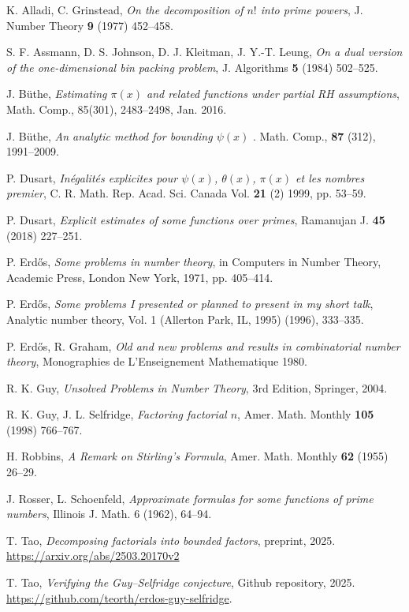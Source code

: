 \documentclass[12pt,a4paper,reqno]{amsart}
\numberwithin{equation}{section}
\theoremstyle{plain}
\theoremstyle{definition}
\begin{document}
\begin{thebibliography}{10}

  
K. Alladi, C. Grinstead, \emph{On the decomposition of $n!$ into prime powers}, J. Number Theory \textbf{9} (1977) 452--458.

S. F. Assmann, D. S. Johnson, D. J. Kleitman, J. Y.-T. Leung, \emph{On a dual version of the one-dimensional bin packing problem}, J. Algorithms \textbf{5} (1984) 502--525.

J. B\"uthe, \emph{Estimating $\pi(x)$ and related functions under partial RH assumptions}, Math. Comp., 85(301), 2483--2498, Jan. 2016.

J. B\"uthe, \emph{An analytic method for bounding $\psi(x)$
}. Math. Comp., \textbf{87} (312), 1991--2009.


P. Dusart, \emph{In\'egalit\'es explicites pour $\psi(x)$, $\theta(x)$, $\pi(x)$ et les nombres premier}, C. R. Math. Rep. Acad. Sci. Canada Vol. \textbf{21} (2) 1999, pp. 53--59.


P. Dusart, \emph{Explicit estimates of some functions over primes}, Ramanujan J. \textbf{45} (2018) 227--251.

P. Erd\H{o}s, \emph{Some problems in number theory}, in Computers in Number Theory, Academic Press, London New York, 1971, pp. 405--414.

P. Erd\H{o}s, \emph{Some problems I presented or planned to present in my short talk}, Analytic number theory, Vol. 1 (Allerton Park, IL, 1995) (1996), 333--335.

P. Erd\H{o}s, R. Graham, \emph{Old and new problems and results in combinatorial number theory}, Monographies de L'Enseignement Mathematique 1980.

R. K. Guy, \emph{Unsolved Problems in Number Theory}, 3rd Edition, Springer, 2004.

R. K. Guy, J. L. Selfridge, \emph{Factoring factorial $n$}, Amer. Math. Monthly \textbf{105} (1998) 766--767.

H. Robbins, \emph{A Remark on Stirling's Formula}, Amer. Math. Monthly \textbf{62} (1955) 26--29.


J. Rosser, L. Schoenfeld, \emph{Approximate formulas for some functions of prime numbers}, Illinois J. Math. 6 (1962), 64--94.

T. Tao, \emph{Decomposing factorials into bounded factors}, preprint, 2025. \url{https://arxiv.org/abs/2503.20170v2}

T. Tao, \emph{Verifying the Guy--Selfridge conjecture}, Github repository, 2025.  \url{https://github.com/teorth/erdos-guy-selfridge}.

\end{thebibliography}
\end{document}
